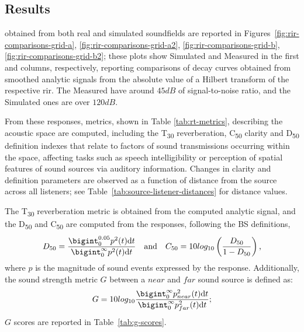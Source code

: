 \subsection{Results}
 obtained from both real and simulated soundfields are reported in Figures~\ref{fig:rir-comparisons-grid-a}, \ref{fig:rir-comparisons-grid-a2}, \ref{fig:rir-comparisons-grid-b}, \ref{fig:rir-comparisons-grid-b2}; these plots show Simulated and Measured  in the first and columns, respectively, reporting comparisons of decay curves obtained from smoothed analytic signals from the absolute value of a Hilbert transform of the respective \acrshort{rir}. The Measured  have around $45dB$ of signal-to-noise ratio, and the Simulated ones are over $120dB$. \par
From these responses, metrics, shown in Table \ref{tab:rt-metrics}, describing the acoustic space are computed, including the T\textsubscript{30} reverberation, C\textsubscript{50} clarity and D\textsubscript{50} definition indexes that relate to factors of sound transmissions occurring within the space, affecting tasks such as speech intelligibility or perception of spatial features of sound sources via auditory information. Changes in clarity and definition parameters are observed as a function of distance from the source across all listeners; see Table~\ref{tab:source-listener-distances} for distance values. \par
The T\textsubscript{30} reverberation metric is obtained from the computed analytic signal, and the D\textsubscript{50} and C\textsubscript{50} are computed from the responses, following the BS \cite{bs3382-1} definitions,
\begin{equation}
    D_{50} = \frac{\bigint_{0}^{0.05} p^2(t)\textrm{d}t}{\bigint_{0}^{\infty} p^2(t)\textrm{d}t}\quad \textrm{and} \quad C_{50} = 10log_{10} \left( \frac{D_{50}}{1-D_{50}} \right)\textrm{,}
\end{equation}
where $p$ is the magnitude of sound events expressed by the response. Additionally, the sound strength metric $G$ between a $near$ and $far$ sound source is defined as:
\begin{equation}
    G = 10 log_{10} \frac{\bigint_{0}^{\infty} p_{near}^2(t)\textrm{d}t}{\bigint_{0}^{\infty} p_{far}^2(t)\textrm{d}t} \textrm{;}
\end{equation}
$G$ scores are reported in Table~\ref{tab:g-scores}.

